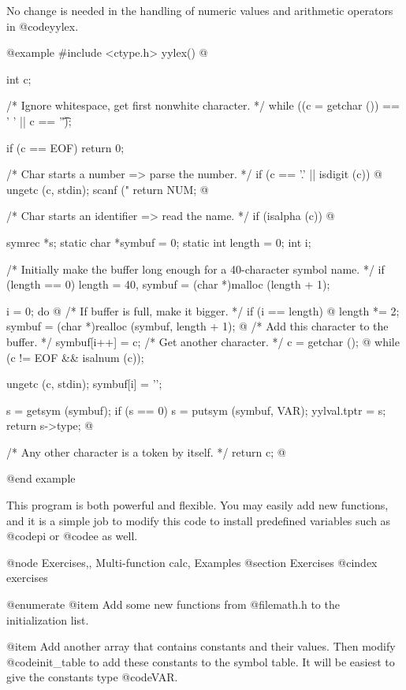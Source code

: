 {{{{{{{{{{{{{{No change is needed in the handling of numeric values and arithmetic
operators in @code{yylex}.

@example
#include <ctype.h>
yylex()
@{
  int c;

  /* Ignore whitespace, get first nonwhite character.  */
  while ((c = getchar ()) == ' ' || c == '\t');

  if (c == EOF)
    return 0;

  /* Char starts a number => parse the number.         */
  if (c == '.' || isdigit (c))
    @{
      ungetc (c, stdin);
      scanf ("%
      return NUM;
    @}

  /* Char starts an identifier => read the name.       */
  if (isalpha (c))
    @{
      symrec *s;
      static char *symbuf = 0;
      static int length = 0;
      int i;

      /* Initially make the buffer long enough
         for a 40-character symbol name.  */
      if (length == 0)
        length = 40, symbuf = (char *)malloc (length + 1);

      i = 0;
      do
        @{
          /* If buffer is full, make it bigger.        */
          if (i == length)
            @{
              length *= 2;
              symbuf = (char *)realloc (symbuf, length + 1);
            @}
          /* Add this character to the buffer.         */
          symbuf[i++] = c;
          /* Get another character.                    */
          c = getchar ();
        @}
      while (c != EOF && isalnum (c));

      ungetc (c, stdin);
      symbuf[i] = '\0';

      s = getsym (symbuf);
      if (s == 0)
        s = putsym (symbuf, VAR);
      yylval.tptr = s;
      return s->type;
    @}

  /* Any other character is a token by itself.        */
  return c;
@}
@end example

This program is both powerful and flexible. You may easily add new
functions, and it is a simple job to modify this code to install predefined
variables such as @code{pi} or @code{e} as well.

@node Exercises,, Multi-function calc, Examples
@section Exercises
@cindex exercises

@enumerate
@item
Add some new functions from @file{math.h} to the initialization list.

@item
Add another array that contains constants and their values.  Then
modify @code{init_table} to add these constants to the symbol table.
It will be easiest to give the constants type @code{VAR}.

}}}}}}}}}}}}}}
